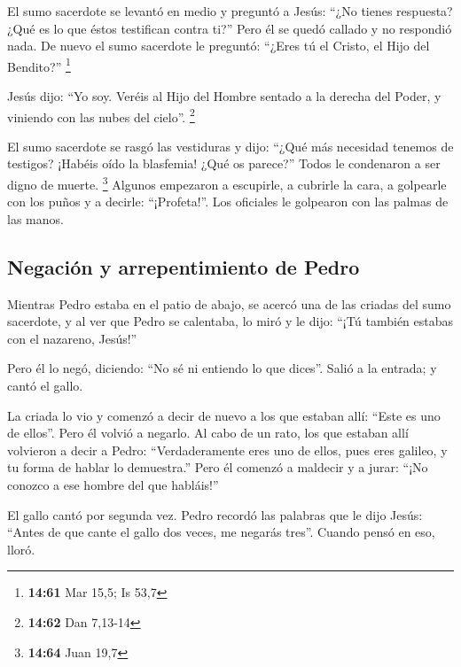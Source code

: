\begin{paracol}{2}
 El sumo sacerdote se levantó en medio y preguntó a
Jesús: ``¿No tienes respuesta? ¿Qué es lo que éstos testifican contra
ti?''  Pero él se quedó callado y no respondió nada. De
nuevo el sumo sacerdote le preguntó: ``¿Eres tú el Cristo, el Hijo del
Bendito?'' \footnote{\textbf{14:61} Mar 15,5; Is 53,7}

 Jesús dijo: ``Yo soy. Veréis al Hijo del Hombre sentado
a la derecha del Poder, y viniendo con las nubes del cielo''.
\footnote{\textbf{14:62} Dan 7,13-14}

 El sumo sacerdote se rasgó las vestiduras y dijo: ``¿Qué
más necesidad tenemos de testigos?  ¡Habéis oído la
blasfemia! ¿Qué os parece?'' Todos le condenaron a ser digno de muerte.
\footnote{\textbf{14:64} Juan 19,7}  Algunos empezaron a
escupirle, a cubrirle la cara, a golpearle con los puños y a decirle:
``¡Profeta!''. Los oficiales le golpearon con las palmas de las manos.

\hypertarget{negaciuxf3n-y-arrepentimiento-de-pedro}{%
\subsection{Negación y arrepentimiento de
Pedro}\label{negaciuxf3n-y-arrepentimiento-de-pedro}}

 Mientras Pedro estaba en el patio de abajo, se acercó
una de las criadas del sumo sacerdote,  y al ver que
Pedro se calentaba, lo miró y le dijo: ``¡Tú también estabas con el
nazareno, Jesús!''

 Pero él lo negó, diciendo: ``No sé ni entiendo lo que
dices''. Salió a la entrada; y cantó el gallo.

 La criada lo vio y comenzó a decir de nuevo a los que
estaban allí: ``Este es uno de ellos''.  Pero él volvió a
negarlo. Al cabo de un rato, los que estaban allí volvieron a decir a
Pedro: ``Verdaderamente eres uno de ellos, pues eres galileo, y tu forma
de hablar lo demuestra.''  Pero él comenzó a maldecir y a
jurar: ``¡No conozco a ese hombre del que habláis!''

 El gallo cantó por segunda vez. Pedro recordó las
palabras que le dijo Jesús: ``Antes de que cante el gallo dos veces, me
negarás tres''. Cuando pensó en eso, lloró.

\switchcolumn
\begin{otherlanguage}{english}


\end{otherlanguage}
\end{paracol}
